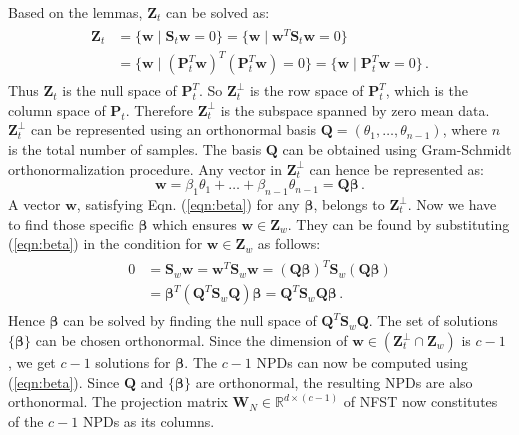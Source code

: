 \documentclass[runningheads]{llncs}
\begin{document}
Based on the lemmas, $\mathbf{Z}_t$ can be solved as:
\begin{eqnarray}
\begin{aligned}
\mathbf{Z}_t  &= \lbrace  \mathbf{w}  \; \vert \;  \mathbf{S}_t \mathbf{w} = 0\rbrace = \lbrace  \mathbf{w} \; \vert \;  \mathbf{w}^T \mathbf{S}_t \mathbf{w} = 0\rbrace \\
&= \lbrace  \mathbf{w} \; \vert \;  (\mathbf{P}_t^T \mathbf{w})^T (\mathbf{P}_t^T \mathbf{w})  = 0\rbrace = \lbrace  \mathbf{w} \; \vert \;  \mathbf{P}_t^T \mathbf{w}  = 0\rbrace \,.
\end{aligned}
\end{eqnarray}
Thus $\mathbf{Z}_t$ is the null space of $\mathbf{P}_t^T$. So $\mathbf{Z}^\perp_t$ is the row space of $\mathbf{P}_t^T$, which is the column space of $\mathbf{P}_t$. Therefore $\mathbf{Z}^\perp_t$ is the subspace spanned by zero mean data. $\mathbf{Z}^\perp_t$ can be represented using an orthonormal basis $\mathbf{Q} = (\theta_1,\ldots, \theta_{n-1})$, where $n$ is the total number of samples. The basis $\mathbf{Q}$ can be obtained using Gram-Schmidt orthonormalization procedure. Any vector in $\mathbf{Z}^\perp_t$ can hence be represented as:
\begin{equation}
\label{eqn:beta}
\mathbf{w} = \beta_1 \theta_1 + \ldots + \beta_{n-1} \theta_{n-1} = \mathbf{Q}\bm{\beta}\,.
\end{equation}
A vector $\mathbf{w}$, satisfying Eqn. (\ref{eqn:beta}) for any $\bm{\beta}$, belongs to $\mathbf{Z}_t^\perp$.  Now we have to find those specific  $\bm{\beta}$ which ensures $\mathbf{w}\in \mathbf{Z}_w$. They can be found by substituting (\ref{eqn:beta}) in the condition for $\mathbf{w}\in \mathbf{Z}_w$ as follows:
\begin{eqnarray}
\begin{aligned}
0 &= \mathbf{S}_w \mathbf{w}  = \mathbf{w}^T \mathbf{S}_w \mathbf{w} = (\mathbf{Q\beta})^T \mathbf{S}_w (\mathbf{Q}\bm{\beta})\\
&= \bm{\beta}^T(\mathbf{Q}^T \mathbf{S}_w \mathbf{Q})\bm{\beta} = \mathbf{Q}^T \mathbf{S}_w \mathbf{Q}\bm{\beta}\,.
\end{aligned}
\end{eqnarray}
Hence $\bm{\beta}$ can be solved by finding the null space of $\mathbf{Q}^T \mathbf{S}_w \mathbf{Q}$. The set of solutions $\{\bm{\beta}\}$ can be chosen orthonormal. Since the dimension of $\mathbf{w} \in (\mathbf{Z}_t^\perp \cap \mathbf{Z}_w)$ is $c-1$ \cite{guo:nfst}, we get $c-1$ solutions for $\bm{\beta}$.  The $c-1$ NPDs can now be computed using (\ref{eqn:beta}). Since $\mathbf{Q}$ and $\{\bm{\beta}\}$ are orthonormal, the resulting NPDs are also orthonormal. The projection matrix $\mathbf{W}_N \in \mathbb{R}^{d \times (c-1)}$ of NFST now constitutes of the $c-1$ NPDs as its columns.
\end{document}

